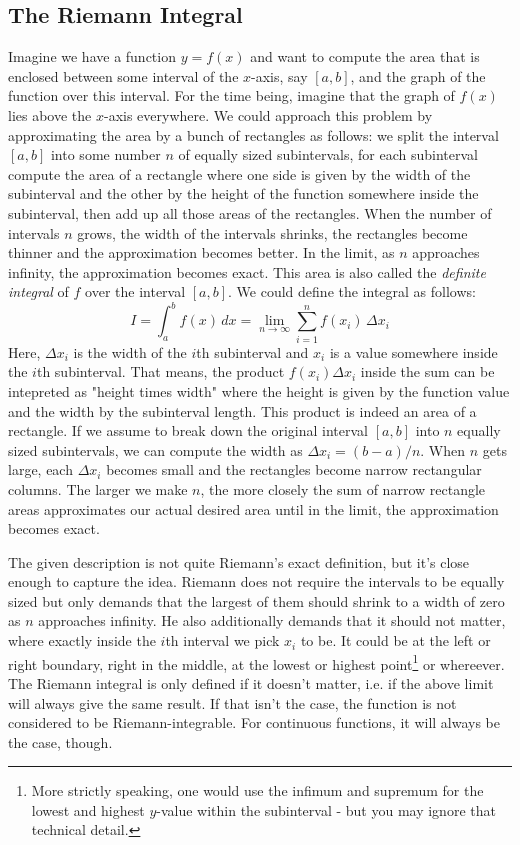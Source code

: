 \subsection{The Riemann Integral} 
Imagine we have a function $y = f(x)$ and want to compute the area that is enclosed between some interval of the $x$-axis, say $[a,b]$, and the graph of the function over this interval. For the time being, imagine that the graph of $f(x)$ lies above the $x$-axis everywhere. We could approach this problem by approximating the area by a bunch of rectangles as follows: we split the interval $[a,b]$ into some number $n$ of equally sized subintervals, for each subinterval compute the area of a rectangle where one side is given by the width of the subinterval and the other by the height of the function somewhere inside the subinterval, then add up all those areas of the rectangles. When the number of intervals $n$ grows, the width of the intervals shrinks, the rectangles become thinner and the approximation becomes better. In the limit, as $n$ approaches infinity, the approximation becomes exact. This area is also called the \emph{definite integral} of $f$ over the interval $[a,b]$. We could define the integral as follows:
\begin{equation}
\label{Eq:RiemannIntegral1D}	
 I = \int_a^b f(x) \, dx = \lim_{n \rightarrow \infty}  \sum_{i=1}^n f(x_i) \, \Delta x_i
\end{equation}
Here, $\Delta x_i$ is the width of the $i$th subinterval and $x_i$ is a value somewhere inside the $i$th subinterval. That means, the product $f(x_i)  \Delta x_i$ inside the sum can be intepreted as "height times width" where the height is given by the function value and the width by the subinterval length. This product is indeed an area of a rectangle. If we assume to break down the original interval $[a,b]$ into $n$ equally sized subintervals, we can compute the width as $\Delta x_i = (b-a)/n$. When $n$ gets large, each $\Delta x_i$ becomes small and the rectangles become narrow rectangular columns. The larger we make $n$, the more closely the sum of narrow rectangle areas approximates our actual desired area until in the limit, the approximation becomes exact.

\medskip
The given description is not quite Riemann's exact definition, but it's close enough to capture the idea. Riemann does not require the intervals to be equally sized but only demands that the largest of them should shrink to a width of zero as $n$ approaches infinity. He also additionally demands that it should not matter, where exactly inside the $i$th interval we pick $x_i$ to be. It could be at the left or right boundary, right in the middle, at the lowest or highest point\footnote{More strictly speaking, one would use the infimum and supremum for the lowest and highest $y$-value within the subinterval - but you may ignore that technical detail.} or whereever. The Riemann integral is only defined if it doesn't matter, i.e. if the above limit will always give the same result. If that isn't the case, the function is not considered to be Riemann-integrable. For continuous functions, it will always be the case, though.

